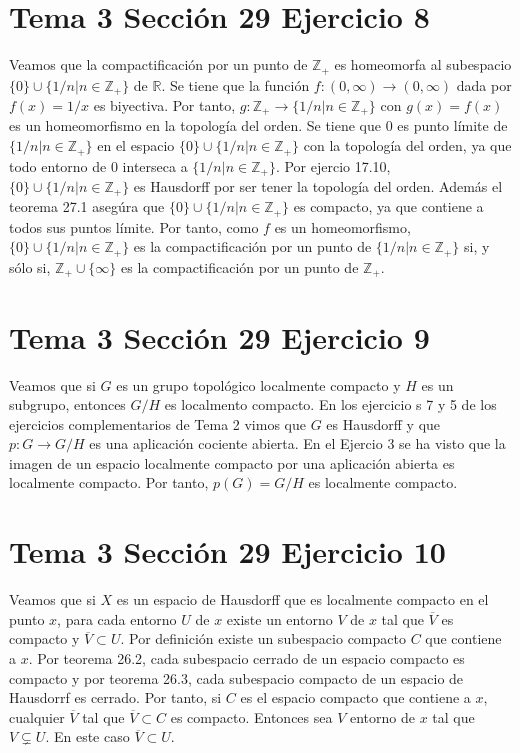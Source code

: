 \documentclass{article}
\begin{document}
\section{Tema 3 Sección 29 Ejercicio 8}
Veamos que la compactificación por un punto de $\mathbb{Z}_+$ es homeomorfa al subespacio $\{0\}\cup\{1/n|n\in\mathbb{Z}_+\}$ de $\mathbb{R}$. Se tiene que la función $f:(0,\infty)\rightarrow (0,\infty)$ dada por $f(x)=1/x$ es biyectiva. Por tanto, $g:\mathbb{Z}_+\rightarrow \{1/n|n\in\mathbb{Z}_+\}$ con $g(x)=f(x)$ es un homeomorfismo en la topología del orden. Se tiene que $0$ es punto límite de $\{1/n|n\in\mathbb{Z}_+\}$ en el espacio $\{0\}\cup\{1/n|n\in\mathbb{Z}_+\}$ con la topología del orden, ya que todo entorno de $0$ interseca a $\{1/n|n\in\mathbb{Z}_+\}$. Por ejercio 17.10, $\{0\}\cup\{1/n|n\in\mathbb{Z}_+\}$ es Hausdorff por ser tener la topología del orden. Además el teorema 27.1 asegúra que $\{0\}\cup\{1/n|n\in\mathbb{Z}_+\}$ es compacto, ya que contiene a todos sus puntos límite. Por tanto, como $f$ es un homeomorfismo, $\{0\}\cup\{1/n|n\in\mathbb{Z}_+\}$ es la compactificación por un punto de $\{1/n|n\in\mathbb{Z}_+\}$ si, y sólo si, $\mathbb{Z}_+\cup\{\infty\}$ es la compactificación por un punto de $\mathbb{Z}_+$.
\section{Tema 3 Sección 29 Ejercicio 9}
Veamos que si $G$ es un grupo topológico localmente compacto y $H$ es un subgrupo, entonces $G/H$ es localmento compacto. En los ejercicio s 7 y 5 de los ejercicios complementarios de Tema 2 vimos que $G$ es Hausdorff y que $p:G\rightarrow G/H$ es una aplicación cociente abierta. En el Ejercio 3 se ha visto que la imagen de un espacio localmente compacto por una aplicación abierta es localmente compacto. Por tanto, $p(G)=G/H$ es localmente compacto.
\section{Tema 3 Sección 29 Ejercicio 10}
Veamos que si $X$ es un espacio de Hausdorff que es localmente compacto en el punto $x$, para cada entorno $U$ de $x$ existe un entorno $V$ de $x$ tal que $\overline{V}$ es compacto y $\overline{V}\subset U$. Por definición existe un subespacio compacto $C$ que contiene a $x$. Por teorema 26.2, cada subespacio cerrado de un espacio compacto es compacto y por teorema 26.3, cada subespacio compacto de un espacio de Hausdorrf es cerrado. Por tanto, si $C$ es el espacio compacto que contiene a $x$, cualquier $\overline{V}$ tal que $\overline{V}\subset C$ es compacto. Entonces sea $V$ entorno de $x$ tal que $V\subsetneq U$. En este caso $\overline{V}\subset U$.
\end{document}
